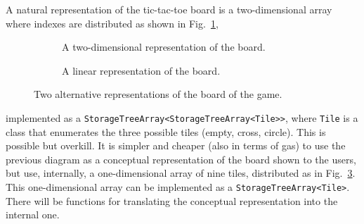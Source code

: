 A natural representation of the tic-tac-toe board is a two-dimensional array
where indexes are distributed as shown in Fig.~\ref{fig:tictactoe_grid},
%
\begin{figure}
\centering
\begin{subfigure}{.5\textwidth}
  \centering
  \caption{A two-dimensional representation of the board.}
  \label{fig:tictactoe_grid}
\end{subfigure}%
\begin{subfigure}{.5\textwidth}
  \centering
  \caption{A linear representation of the board.}
  \label{fig:tictactoe_linear}
\end{subfigure}
\caption{Two alternative representations of the board of the game.}
\end{figure}
%
implemented as a \texttt{StorageTreeArray<StorageTreeArray<Tile>>}, where \texttt{Tile} is
a class that enumerates the three possible tiles (empty, cross, circle). This is
possible but overkill. It is simpler and cheaper (also in terms of gas)
to use the previous diagram as a conceptual representation of the board
shown to the users, but use, internally,
a one-dimensional array of nine tiles, distributed as in
Fig.~\ref{fig:tictactoe_linear}.
This one-dimensional array can be implemented as a \texttt{StorageTreeArray<Tile>}.
There will be functions
for translating the conceptual representation into the internal one.

